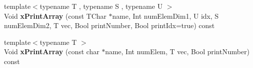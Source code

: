 \begin{DoxyCompactItemize}
\item 
\mbox{\label{class_t_com_v_p_s_a59edebd35754cc161fd3070609b34a6c}} 
{\footnotesize template$<$typename T , typename S , typename U $>$ }\\Void {\bfseries x\+Print\+Array} (const T\+Char $\ast$name, Int num\+Elem\+Dim1, U idx, S num\+Elem\+Dim2, T vec, Bool print\+Number, Bool print\+Idx=true) const
\item 
\mbox{\label{class_t_com_v_p_s_a703ec834eb2760ad960c31870d92c61d}} 
{\footnotesize template$<$typename T $>$ }\\Void {\bfseries x\+Print\+Array} (const char $\ast$name, Int num\+Elem, T vec, Bool print\+Number) const
\end{DoxyCompactItemize}
